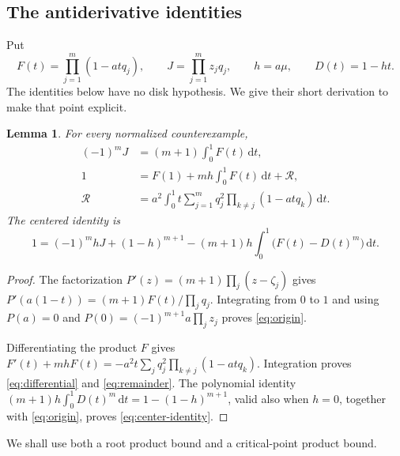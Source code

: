 \documentclass[11pt,reqno]{amsart}
\newtheorem{lem}[thm]{Lemma}
\theoremstyle{definition}
\theoremstyle{remark}
\numberwithin{equation}{section}
\newcommand{\dd}{\,\mathrm d}
\begin{document}
\subsection{The antiderivative identities}

Put
\[
 F(t)=\prod_{j=1}^m(1-atq_j),\qquad
 J=\prod_{j=1}^m z_jq_j,\qquad h=a\mu,\qquad D(t)=1-ht.
\]
The identities below have no disk hypothesis. We give their short derivation to make that point explicit.

\begin{lem}\label{lem:identities}
For every normalized counterexample,
\begin{align}
 (-1)^mJ&=(m+1)\int_0^1F(t)\dd t,\label{eq:origin}\\
 1&=F(1)+mh\int_0^1F(t)\dd t+\mathcal R,\label{eq:differential}\\
 \mathcal R&=a^2\int_0^1t\sum_{j=1}^m q_j^2
                  \prod_{k\ne j}(1-atq_k)\dd t.\label{eq:remainder}
\end{align}
The centered identity is
\begin{equation}\label{eq:center-identity}
 1=(-1)^m hJ+(1-h)^{m+1}
 -(m+1)h\int_0^1\bigl(F(t)-D(t)^m\bigr)\dd t.
\end{equation}
\end{lem}
\begin{proof}
The factorization $P'(z)=(m+1)\prod_j(z-\zeta_j)$ gives
$P'(a(1-t))=(m+1)F(t)/\prod_jq_j$. Integrating from $0$ to $1$ and using $P(a)=0$ and $P(0)=(-1)^{m+1}a\prod_jz_j$ proves \eqref{eq:origin}.

Differentiating the product $F$ gives
$F'(t)+mhF(t)=-a^2t\sum_jq_j^2\prod_{k\ne j}(1-atq_k)$.
Integration proves \eqref{eq:differential} and \eqref{eq:remainder}. The polynomial identity
$(m+1)h\int_0^1D(t)^m\dd t=1-(1-h)^{m+1}$,
valid also when $h=0$, together with \eqref{eq:origin}, proves \eqref{eq:center-identity}.
\end{proof}

We shall use both a root product bound and a critical-point product bound.
\end{document}
